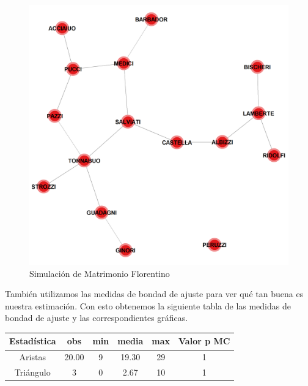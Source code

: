 \begin{figure}[h]
\includegraphics[width=.75\textwidth]{Tesis/Figures/FlorentineSIM.png}
\caption{Simulación de Matrimonio Florentino}
\centering
\end{figure}

También utilizamos las medidas de bondad de ajuste para ver qué tan buena es nuestra estimación. Con esto obtenemos la siguiente tabla de las medidas de bondad de ajuste y las correspondientes gráficas.

\begin{center}
 \begin{tabular}{||c c c c c c||} 
 \hline
 Estadística & obs & min & media & max & Valor p MC \\ [.5ex]
 \hline\hline
 Aristas & 20.00 & 9 & 19.30 & 29 & 1 \\ 
 \hline
 Triángulo & 3 & 0 & 2.67 & 10 & 1 \\
 \hline
\end{tabular}
\end{center}

